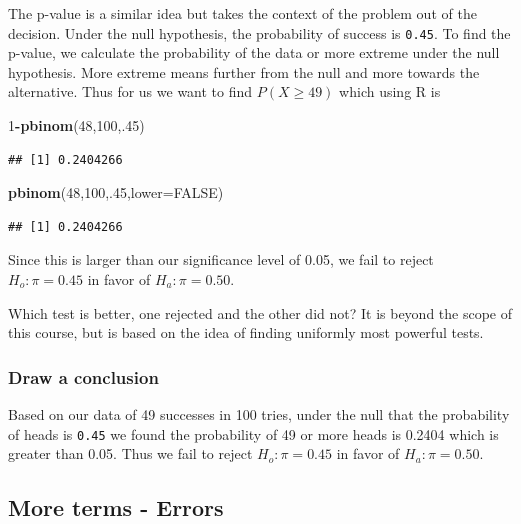 \documentclass[]{book}
\newenvironment{Shaded}{\begin{snugshade}}{\end{snugshade}}
\newcommand{\KeywordTok}[1]{\textcolor[rgb]{0.13,0.29,0.53}{\textbf{#1}}}
\newcommand{\DataTypeTok}[1]{\textcolor[rgb]{0.13,0.29,0.53}{#1}}
\newcommand{\DecValTok}[1]{\textcolor[rgb]{0.00,0.00,0.81}{#1}}
\newcommand{\OtherTok}[1]{\textcolor[rgb]{0.56,0.35,0.01}{#1}}
\newcommand{\OperatorTok}[1]{\textcolor[rgb]{0.81,0.36,0.00}{\textbf{#1}}}
\newcommand{\NormalTok}[1]{#1}
\theoremstyle{definition}
\theoremstyle{definition}
\theoremstyle{definition}
\theoremstyle{remark}
\begin{document}
The p-value is a similar idea but takes the context of the problem out
of the decision. Under the null hypothesis, the probability of success
is \texttt{0.45}. To find the p-value, we calculate the probability of
the data or more extreme under the null hypothesis. More extreme means
further from the null and more towards the alternative. Thus for us we
want to find \(P(X \geq 49)\) which using R is

\begin{Shaded}
\begin{Highlighting}[]
\DecValTok{1}\OperatorTok{-}\KeywordTok{pbinom}\NormalTok{(}\DecValTok{48}\NormalTok{,}\DecValTok{100}\NormalTok{,.}\DecValTok{45}\NormalTok{)}
\end{Highlighting}
\end{Shaded}

\begin{verbatim}
## [1] 0.2404266
\end{verbatim}

\begin{Shaded}
\begin{Highlighting}[]
\KeywordTok{pbinom}\NormalTok{(}\DecValTok{48}\NormalTok{,}\DecValTok{100}\NormalTok{,.}\DecValTok{45}\NormalTok{,}\DataTypeTok{lower=}\OtherTok{FALSE}\NormalTok{)}
\end{Highlighting}
\end{Shaded}

\begin{verbatim}
## [1] 0.2404266
\end{verbatim}

Since this is larger than our significance level of 0.05, we fail to
reject \(H_{o}: \pi = 0.45\) in favor of \(H_{a}: \pi = 0.50\).

Which test is better, one rejected and the other did not? It is beyond
the scope of this course, but is based on the idea of finding uniformly
most powerful tests.

\subsubsection{Draw a conclusion}\label{draw-a-conclusion}

Based on our data of 49 successes in 100 tries, under the null that the
probability of heads is \texttt{0.45} we found the probability of 49 or
more heads is 0.2404 which is greater than 0.05. Thus we fail to reject
\(H_{o}: \pi = 0.45\) in favor of \(H_{a}: \pi = 0.50\).

\subsection{More terms - Errors}\label{more-terms---errors}
\end{document}

